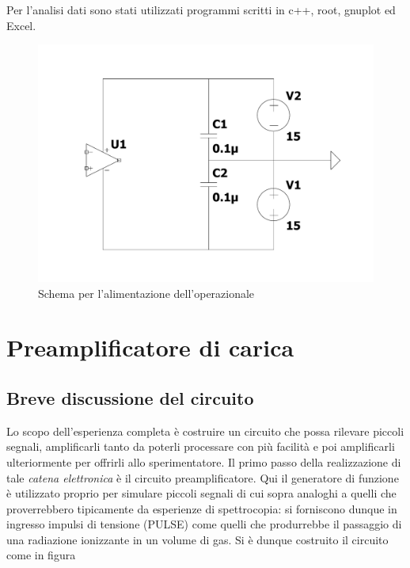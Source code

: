 \documentclass{article}
\begin{document}
Per l'analisi dati sono stati utilizzati programmi scritti in c++, root, gnuplot ed Excel.

\begin{center}
\begin{figure}[H]
\centering
\includegraphics[scale=0.28, angle=0]{alimentazione.pdf}
\caption{ Schema per l'alimentazione dell'operazionale }
\label{fig:alimentazione}
\end{figure}
\end{center} 

\section{Preamplificatore di carica}

\subsection{Breve discussione del circuito}

Lo scopo dell'esperienza completa è costruire un circuito che possa rilevare piccoli segnali, amplificarli tanto da poterli processare con più facilità
e poi amplificarli ulteriormente per offrirli allo sperimentatore. Il primo passo della realizzazione di tale \textit{catena elettronica} è il circuito
preamplificatore. Qui il generatore di funzione è utilizzato proprio per simulare piccoli segnali di cui sopra analoghi a quelli che proverrebbero tipicamente 
da esperienze di spettrocopia: si forniscono dunque in ingresso impulsi di tensione (PULSE) come quelli che produrrebbe il passaggio di una radiazione ionizzante in 
un volume di gas. 
Si è dunque costruito il circuito come in figura
\end{document}
